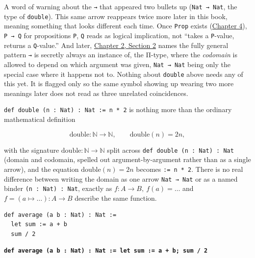 A word of warning about the \texttt{→} that appeared two bullets up (\texttt{Nat → Nat}, the type of \texttt{double}). This same arrow reappears twice more later in this book, meaning something that looks different each time. Once \texttt{Prop} exists (\hyperref[sec:04-propositions-and-proofs:04-implication:1]{Chapter 4}), \texttt{P → Q} for propositions \texttt{P}, \texttt{Q} reads as logical implication, not ``takes a \texttt{P}-value, returns a \texttt{Q}-value.'' And later, \hyperref[sec:02-terminology-and-coc:02-pi-sigma-and-coc:1]{Chapter 2, Section 2} names the fully general pattern \texttt{→} is secretly always an instance of, the Π-type, where the \emph{codomain} is allowed to depend on which argument was given, \texttt{Nat → Nat} being only the special case where it happens not to. Nothing about \texttt{double} above needs any of this yet. It is flagged only so the same symbol showing up wearing two more meanings later does not read as three unrelated coincidences.

\begin{mathreading}

\texttt{def double (n : Nat) : Nat := n * 2} is nothing more than the ordinary mathematical definition

\end{mathreading}

\[
\mathrm{double} : \mathbb{N} \to \mathbb{N}, \qquad \mathrm{double}(n) = 2n,
\]

with the signature \(\mathrm{double} : \mathbb{N} \to \mathbb{N}\) split across \texttt{def double (n : Nat) : Nat} (domain and codomain, spelled out argument-by-argument rather than as a single arrow), and the equation \(\mathrm{double}(n) = 2n\) becomes \texttt{:= n * 2}. There is no real difference between writing the domain as one arrow \texttt{Nat → Nat} or as a named binder \texttt{(n : Nat) : Nat}, exactly as \(f : A \to B,\ f(a) = \ldots\) and \(f = (a \mapsto \ldots) : A \to B\) describe the same function.

\begin{lstlisting}
def average (a b : Nat) : Nat :=
  let sum := a + b
  sum / 2
\end{lstlisting}

\textbf{\texttt{def average (a b : Nat) : Nat := let sum := a + b; sum /\allowbreak{} 2}}

